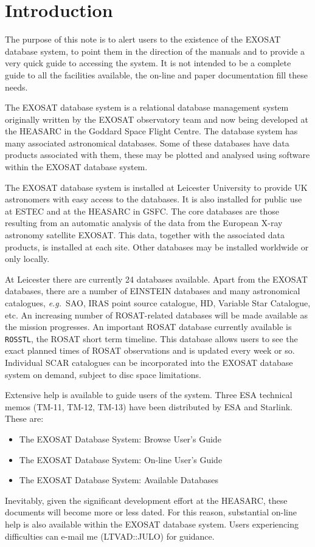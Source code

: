 \documentclass[nolof,11pt]{starlink}
\begin{document}
\scfrontmatter

\section{Introduction}

The purpose of this note is to alert users to the existence of the EXOSAT
database system, to point them in the direction of the manuals and to
provide a very quick guide to accessing the system. It is not intended to be
a complete guide to all the facilities available, the on-line
and paper documentation fill these needs.

The EXOSAT database system is a relational database management system
originally written by the EXOSAT observatory team and now being developed
at the HEASARC in the Goddard Space Flight Centre. The database system has
many associated
astronomical databases. Some of these databases have data
products associated with them, these may be plotted and analysed using
software within the EXOSAT database system.

The EXOSAT database system is installed at Leicester University to provide
UK astronomers with easy access to the databases. It is also installed for
public use at
ESTEC and at the HEASARC in GSFC. The core databases are those resulting
from an automatic analysis of the data from the European X-ray astronomy
satellite EXOSAT. This data, together with the associated data products, is
installed at each site. Other databases may be installed worldwide or only
locally.

At Leicester there are currently 24 databases available. Apart from the
EXOSAT databases, there are a number of EINSTEIN databases and many
astronomical catalogues, \textit{e.g.}~SAO,
IRAS point source catalogue, HD, Variable Star Catalogue, etc.
An increasing number of ROSAT-related
databases will be made available as the mission progresses. An important
ROSAT database currently available is \texttt{ROSSTL},
the ROSAT short term timeline.
This database allows users to see the exact planned times of ROSAT
observations and is updated every week or so. Individual SCAR catalogues can
be incorporated into the EXOSAT database system on demand, subject to disc
space limitations.

Extensive help is available to guide users of the system. Three ESA
technical memos (TM-11, TM-12, TM-13) have been distributed by ESA and
Starlink. These are:
\begin{itemize}
\item The EXOSAT Database System: Browse User's Guide
\item The EXOSAT Database System: On-line User's Guide
\item The EXOSAT Database System: Available Databases
\end{itemize}
Inevitably, given the significant development effort at the HEASARC, these
documents will become more or less dated. For this reason, substantial
on-line help is also available within the EXOSAT database system. Users
experiencing difficulties can e-mail me (LTVAD::JULO) for guidance.
\end{document}
